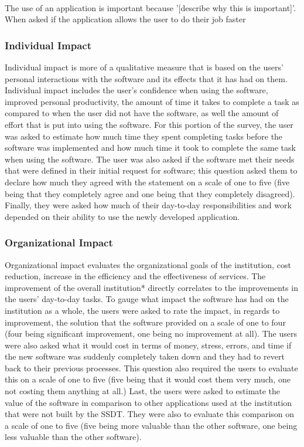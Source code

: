 \paragraph{} The use of an application is important because '[describe why this is important]'. When asked if the application allows the user to do their job faster

\subsubsection{Individual Impact}
Individual impact is more of a qualitative measure that is based on the users' personal interactions with the software and its effects that it has had on them. Individual impact includes the user's confidence when using the software, improved personal productivity, the amount of time it takes to complete a task as compared to when the user did not have the software, as well the amount of effort that is put into using the software. For this portion of the survey, the user was asked to estimate how much time they spent completing tasks before the software was implemented and how much time it took to complete the same task when using the software. The user was also asked if the software met their needs that were defined in their initial request for software; this question asked them to declare how much they agreed with the statement on a scale of one to five (five being that they completely agree and one being that they  completely disagreed). Finally, they were asked how much of their day-to-day responsibilities and work depended on their ability to use the newly developed application.

\paragraph{}

\subsubsection{Organizational Impact}
Organizational impact evaluates the organizational goals of the institution, cost reduction, increase in the efficiency and the effectiveness of services. The improvement of the overall institution* directly correlates to the improvements in the users' day-to-day tasks. To gauge what impact the software has had on the institution as a whole, the users were asked to rate the impact, in regards to improvement, the solution that the software provided on a scale of one to four (four being significant improvement, one being no improvement at all). The users were also asked what it would cost in terms of money, stress, errors, and time if the new software was suddenly completely taken down and they had to revert back to their previous processes. This question also required the users to evaluate this on a scale of one to five (five being that it would cost them very much, one not costing them anything at all.) Last, the users were asked to estimate the value of the software in comparison to other applications used at the institution that were not built by the SSDT. They were also to evaluate this comparison on a scale of one to five (five being more valuable than the other software, one being less valuable than the other software).

